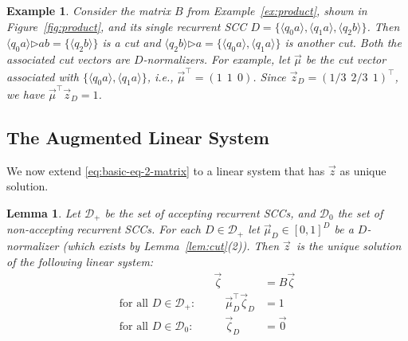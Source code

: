 \documentclass{elsarticle}
\newtheorem{lemma}[definition]{Lemma}
\newtheorem{example}[definition]{Example}
\def\<{\langle}
\def\>{\rangle}
\def\cD{\mathcal{D}}
\newcommand{\then}{\mathord{\triangleright}}
\begin{document}
\begin{example}
  Consider the matrix $B$ from Example~\ref{ex:product}, shown in
  Figure~\ref{fig:product}, and its single recurrent SCC $D = \{\<q_0a\>,\<q_1a\>,\<q_2b\>\}$.  Then
  $\<q_0 a\> \then ab = \{ \<q_2b\> \}$ is a cut and
  $\<q_2 b \> \then a = \{ \<q_0a\>,\<q_1a\>\}$ is another cut.  Both
  the associated cut vectors are $D$-normalizers.
  For  example, let $\vec{\mu}$ be the cut vector associated with $\{ \<q_0a\>,\<q_1a\>\}$, i.e., $\vec{\mu}^\top = (1 \ \ 1 \ \ 0)$.
  Since $\vec{z}_D = (1/3 \ \ 2/3 \ \ 1)^\top$, we have $\vec{\mu}^\top \vec{z}_D = 1$.
\end{example}

\subsection{The Augmented Linear System} \label{sub:augmented}
We now extend \eqref{eq:basic-eq-2-matrix} to a linear
system that has $\vec{z}$ as unique solution.
\begin{lemma} \label{lem:linear-system}
Let $\cD_+$ be the set of accepting recurrent SCCs, and $\cD_0$ the
set of non-accepting recurrent SCCs.  For each $D \in \cD_+$ let
$\vec{\mu}_D \in [0,1]^D$ be a $D$-normalizer (which
exists by Lemma~\ref{lem:cut}(2)).  Then $\vec{z}$~is the unique
solution of the following linear system:
\begin{equation}
\begin{aligned}
&&\vec{\zeta} & = B \vec{\zeta} \\
\text{for all } D \in \cD_+ :&& \quad \vec{\mu}_D^\top \vec{\zeta}_D & = 1 \\
\text{for all } D \in \cD_0 :&& \quad \vec{\zeta}_D & = \vec{0}
\end{aligned}
\label{eq:linear-system}
\end{equation}
\end{lemma}
\end{document}
